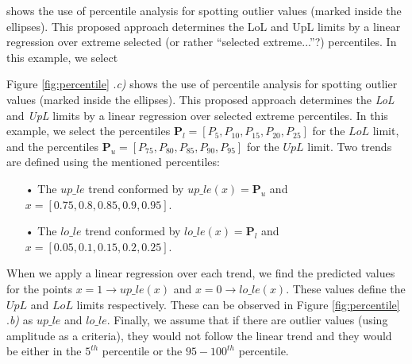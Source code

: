 shows the use of percentile analysis for spotting
outlier values (marked inside the ellipses). This proposed approach determines the LoL and
UpL limits by a linear regression over extreme selected (or rather “selected extreme...”?) percentiles. In this example, we select



Figure \ref{fig:percentile}{\color{red} .\textit{c)}} 
shows the use of percentile analysis for spotting 
outlier values (marked inside the ellipses). This proposed approach determines the \textit{LoL} and \textit{UpL} limits by a linear regression over selected extreme percentiles. In this example, we select the percentiles $\mathbf{P}_l = [P_{5}, P_{10}, P_{15}, P_{20}, P_{25}]$ for the $LoL$ limit, and the percentiles $\mathbf{P}_u = [P_{75},P_{80},P_{85},P_{90},P_{95}]$ for the $UpL$ limit. Two trends are defined using the mentioned percentiles: 
\begin{itemize}
\item[•] The $up\_le$ trend conformed by $up\_le(x) = \mathbf{P}_u$ and $x=[0.75, 0.8, 0.85, 0.9, 0.95]$.
\item[•] The $lo\_le$ trend conformed by $lo\_le(x) = \mathbf{P}_l$ and $x=[0.05, 0.1, 0.15, 0.2, 0.25]$.
\end{itemize}

When we apply a linear regression over each trend, we find the predicted values for the points $x= 1 \to up\_le(x)$ and $x = 0 \to lo\_le(x)$. These values define the $UpL$ and $LoL$ limits respectively. These can be observed in Figure \ref{fig:percentile}{\color{red} .\textit{b)}} as $up\_le$ and $lo\_le$. Finally, we assume that if there are outlier values (using amplitude as a criteria), they would not follow the linear trend and they would be either in the $5^{th}$ percentile or the $95-100^{th}$ percentile.    

